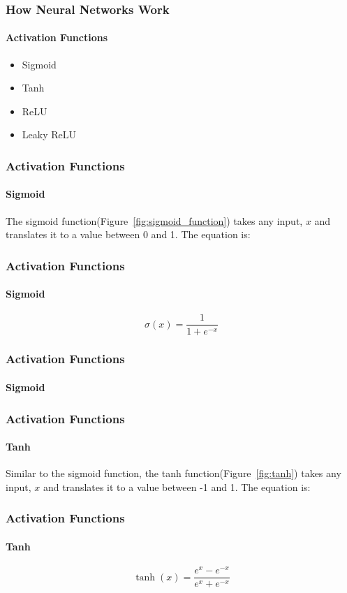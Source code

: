 \documentclass{beamer}
\begin{document}
\begin{frame}
\frametitle{How Neural Networks Work}
\framesubtitle{Activation Functions}
\begin{itemize}
    \item Sigmoid
    \item Tanh
    \item ReLU
    \item Leaky ReLU
\end{itemize}
\end{frame}

\begin{frame}
\frametitle{Activation Functions}
\framesubtitle{Sigmoid}
The sigmoid function(Figure~\ref{fig:sigmoid_function}) takes any input, $x$ and translates it to a value between 0 and 1. The equation is:
\end{frame}

\begin{frame}
\frametitle{Activation Functions}
\framesubtitle{Sigmoid}
\begin{equation}
    \sigma(x) = \frac{1}{1 + e^{-x}}
    \label{eq:sigmoid}
\end{equation}
\end{frame}

\begin{frame}
\frametitle{Activation Functions}
\framesubtitle{Sigmoid}
\begin{figure}[h!]
    \begin{center}
    \end{center}
\end{figure}
\end{frame}

\begin{frame}
\frametitle{Activation Functions}
\framesubtitle{Tanh}
Similar to the sigmoid function, the tanh function(Figure~\ref{fig:tanh}) takes any input, $x$ and translates it to a value between -1 and 1. The equation is:
\end{frame}

\begin{frame}
\frametitle{Activation Functions}
\framesubtitle{Tanh}
\begin{equation}
    \tanh(x) = \frac{e^{x} - e^{-x}}{e^{x} + e^{-x}}
    \label{eq:tanh}
\end{equation}
\end{frame}
\end{document}
